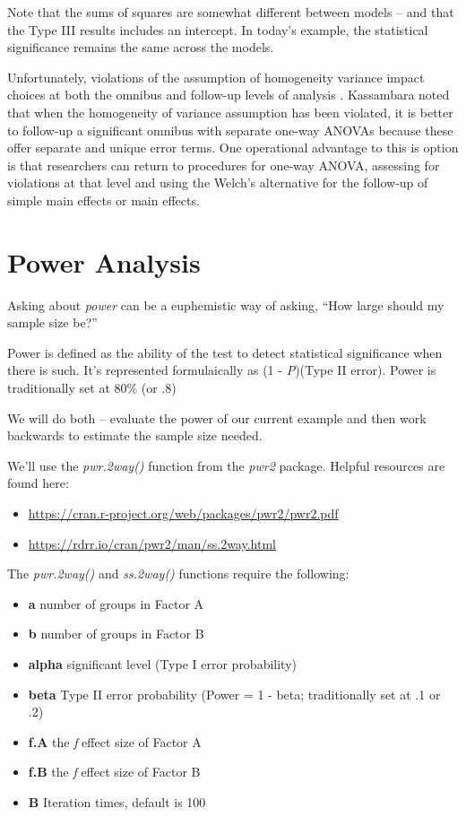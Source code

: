\documentclass[
  11pt,
]{book}
\providecommand{\tightlist}{%
  \setlength{\itemsep}{0pt}\setlength{\parskip}{0pt}}
\begin{document}
Note that the sums of squares are somewhat different between models -- and that the Type III results includes an intercept. In today's example, the statistical significance remains the same across the models.

Unfortunately, violations of the assumption of homogeneity variance impact choices at both the omnibus and follow-up levels of analysis \citep{green_using_2017}. Kassambara \citeyearpar{kassambara_anova_nodate} noted that when the homogeneity of variance assumption has been violated, it is better to follow-up a significant omnibus with separate one-way ANOVAs because these offer separate and unique error terms. One operational advantage to this is option is that researchers can return to procedures for one-way ANOVA, assessing for violations at that level and using the Welch's alternative for the follow-up of simple main effects or main effects.

\hypertarget{power-analysis-1}{%
\section{Power Analysis}\label{power-analysis-1}}

Asking about \emph{power} can be a euphemistic way of asking, ``How large should my sample size be?''

Power is defined as the ability of the test to detect statistical significance when there is such. It's represented formulaically as (1 - \emph{P})(Type II error). Power is traditionally set at 80\% (or .8)

We will do both -- evaluate the power of our current example and then work backwards to estimate the sample size needed.

We'll use the \emph{pwr.2way()} function from the \emph{pwr2} package. Helpful resources are found here:

\begin{itemize}
\tightlist
\item
  \url{https://cran.r-project.org/web/packages/pwr2/pwr2.pdf}
\item
  \url{https://rdrr.io/cran/pwr2/man/ss.2way.html}
\end{itemize}

The \emph{pwr.2way()} and \emph{ss.2way()} functions require the following:

\begin{itemize}
\tightlist
\item
  \textbf{a} number of groups in Factor A
\item
  \textbf{b} number of groups in Factor B
\item
  \textbf{alpha} significant level (Type I error probability)
\item
  \textbf{beta} Type II error probability (Power = 1 - beta; traditionally set at .1 or .2)
\item
  \textbf{f.A} the \emph{f} effect size of Factor A
\item
  \textbf{f.B} the \emph{f} effect size of Factor B
\item
  \textbf{B} Iteration times, default is 100
\end{itemize}
\end{document}

